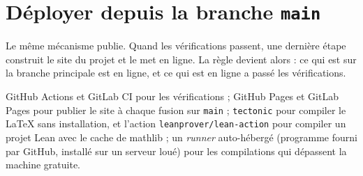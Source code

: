 \section{Déployer depuis la branche \texttt{main}}

Le même mécanisme publie. Quand les vérifications passent, une dernière étape construit le
site du projet et le met en ligne. La règle devient alors : ce qui est sur la branche
principale est en ligne, et ce qui est en ligne a passé les vérifications.

\begin{outils}
GitHub Actions et GitLab CI pour les vérifications ; GitHub Pages et GitLab Pages pour
publier le site à chaque fusion sur \texttt{main} ; \texttt{tectonic} pour compiler le
LaTeX sans installation, et l'action \texttt{leanprover/lean-action} pour compiler un
projet Lean avec le cache de mathlib ; un \emph{runner} auto-hébergé (programme fourni par
GitHub, installé sur un serveur loué) pour les compilations qui dépassent la machine gratuite.
\end{outils}
